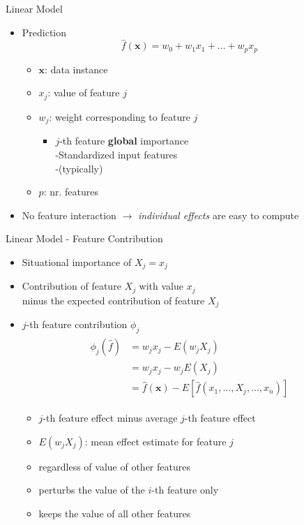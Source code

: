 \begin{frame}{Linear Model}
	\begin{itemize}
		\item Prediction
		\begin{equation}
			\hat{f}(\bm{x})=w_0+w_1 x_{1} + \dots + w_p x_ p
		\end{equation}
		\begin{itemize}
			\item $\bm{x}$: data instance
			\item $x_j$: value of feature $j$
			\item $w_j$: weight corresponding to feature $j$
			\begin{itemize}
				\item $j$-th feature \textbf{global} importance 
				\\-Standardized input features
				\\-(typically) 
			\end{itemize}
			\item $p$: nr. features
		\end{itemize}
		\item No feature interaction $\rightarrow$ \emph{individual effects} are easy to compute
	\end{itemize}
\end{frame}
\begin{frame}{Linear Model - Feature Contribution}
	\begin{itemize}
		\item Situational importance of $X_j = x_j$~\cite{achen1982interpreting}
		\item Contribution of feature $X_j$ with value $x_j$
		\\minus the expected contribution of feature $X_j$
		\item $j$-th feature contribution $\phi_j$
		\begin{align}
			\begin{split}
				\phi_j(\hat{f})
				&=w_{j}x_j-E(w_{j}X_{j})\\
				&=w_{j}x_j-w_{j}E(X_{j})\\
				&=\hat{f}(\bm{x}) - E[\hat{f}(x_1, \dots, X_{j}, \dots, x_n)]
			\end{split}
		\end{align}
		\begin{itemize}
			\item $j$-th feature effect minus average $j$-th feature effect
			\item $E(w_{j}X_{j})$: mean effect estimate for feature $j$
			\item regardless of value of other features
			\item perturbs the value of the $i$-th feature only \item keeps the value of all other features
		\end{itemize}
	\end{itemize}
\end{frame}
